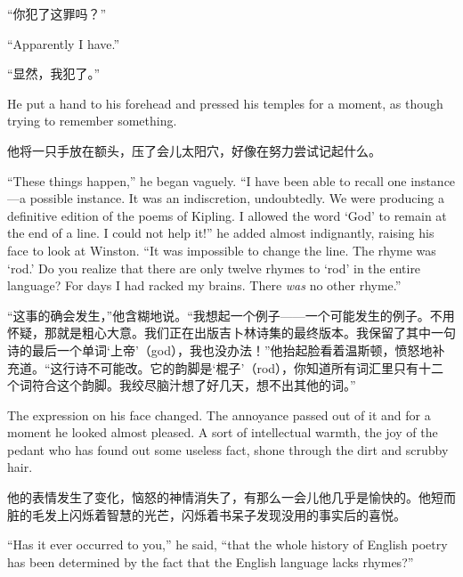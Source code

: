 \begin{paracol}{2}
\switchcolumn

``你犯了这罪吗？''

\switchcolumn*

``Apparently I have.''

\switchcolumn

``显然，我犯了。''

\switchcolumn*

He put a hand to his forehead and pressed his temples for a moment, as
though trying to remember something.

\switchcolumn

他将一只手放在额头，压了会儿太阳穴，好像在努力尝试记起什么。

\switchcolumn*

``These things happen,'' he began vaguely. ``I have been able to recall one
instance---a possible instance. It was an indiscretion, undoubtedly. We were
producing a definitive edition of the poems of Kipling. I allowed the word
`God' to remain at the end of a line. I could not help it!'' he added almost
indignantly, raising his face to look at Winston. ``It was impossible to
change the line. The rhyme was `rod.' Do you realize that there are only
twelve rhymes to `rod' in the entire language? For days I had racked my
brains. There \emph{was} no other rhyme.''

\switchcolumn

``这事的确会发生，''他含糊地说。``我想起一个例子——一个可能发生的例子。不用怀疑，那就是粗心大意。我们正在出版吉卜林诗集的最终版本。我保留了其中一句诗的最后一个单词`上帝'（god），我也没办法！''他抬起脸看着温斯顿，愤怒地补充道。``这行诗不可能改。它的韵脚是`棍子'（rod），你知道所有词汇里只有十二个词符合这个韵脚。我绞尽脑汁想了好几天，想不出其他的词。''

\switchcolumn*

The expression on his face changed. The annoyance passed out of it and
for a moment he looked almost pleased. A sort of intellectual warmth,
the joy of the pedant who has found out some useless fact, shone through
the dirt and scrubby hair.

\switchcolumn

他的表情发生了变化，恼怒的神情消失了，有那么一会儿他几乎是愉快的。他短而脏的毛发上闪烁着智慧的光芒，闪烁着书呆子发现没用的事实后的喜悦。

\switchcolumn*

``Has it ever occurred to you,'' he said, ``that the whole history of
English poetry has been determined by the fact that the English language
lacks rhymes?''


\end{paracol}

